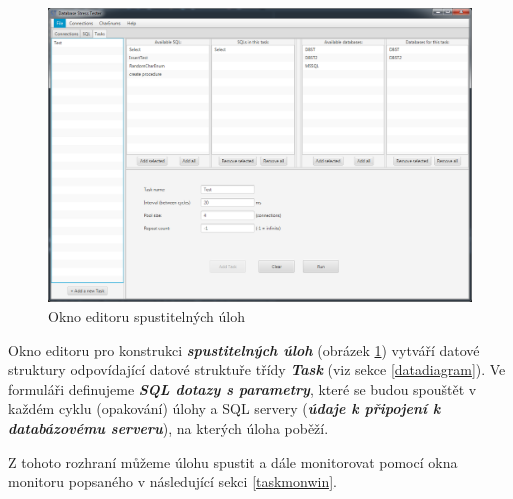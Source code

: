 \documentclass[czech,bachelor,public,dept460,male,cpdeclaration,twoside]{diploma}
\begin{document}
\newpage
\begin{figure}[!htbp]\centering\includegraphics[width=1.0\textwidth]{Figures/taskeditor.png}\caption{Okno editoru spustitelných úloh}
\label{taskeditor}
\end{figure}
Okno editoru pro konstrukci \textbf{\emph{spustitelných úloh}} (obrázek \ref{taskeditor}) vytváří datové struktury odpovídající datové struktuře třídy \textbf{\emph{Task}} (viz sekce \ref{datadiagram}). Ve formuláři definujeme \textbf{\emph{SQL dotazy s parametry}}, které se budou spouštět v každém cyklu (opakování) úlohy a SQL servery (\textbf{\emph{údaje k připojení k databázovému serveru}}), na kterých úloha poběží. 

Z tohoto rozhraní můžeme úlohu spustit a dále monitorovat pomocí okna monitoru popsaného v následující sekci \ref{taskmonwin}.

\newpage
\end{document}
